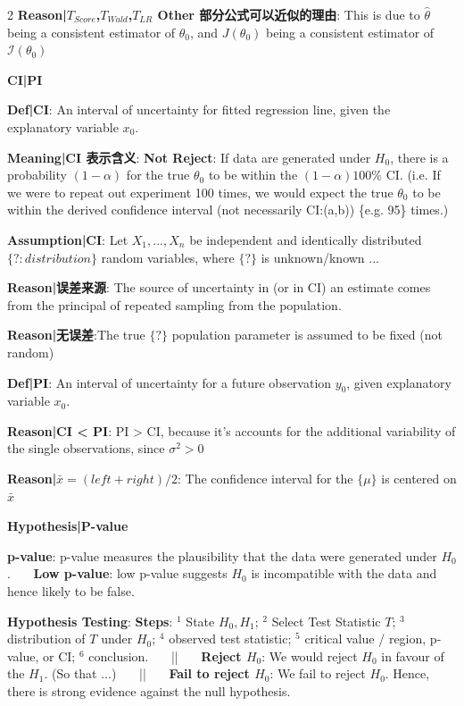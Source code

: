 \documentclass[9pt]{article}
\begin{document}
\begin{multicols}{2}
\textbf{Reason|$T_{Score}$,$T_{Wald}$,$T_{LR}$ Other 部分公式可以近似的理由}: This is due to $\widehat{\theta}$ being a consistent estimator of $\theta_0$, and $J(\theta_0)$ being a consistent estimator of $\mathcal{I}(\theta_0)$


\vspace{5pt}
\textbf{CI|PI}

\textbf{Def|CI}: An interval of uncertainty for fitted regression line, given the explanatory variable $x_0$.

\textbf{Meaning|CI 表示含义}: \textbf{Not Reject}: If data are generated under $H_0$, there is a probability $(1-\alpha)$ for the true $\theta_0$ to be within the $(1-\alpha)100\%$ CI. (i.e. If we were to repeat out experiment 100 times, we would expect the true $\theta_0$ to be within the derived confidence interval (not necessarily CI:(a,b)) \{e.g. 95\} times.)

\textbf{Assumption|CI}: Let $X_1,...,X_n$ be independent and identically distributed $\{?:distribution\}$ random variables, where $\{?\}$ is unknown/known ...

\textbf{Reason|误差来源}: The source of uncertainty in (or in CI) an estimate comes from the principal of repeated sampling from the population. 

\textbf{Reason|无误差}:The true $\{?\}$ population parameter is assumed to be fixed (not random)

\textbf{Def|PI}: An interval of uncertainty for a future observation $y_0$, given explanatory variable $x_0$.

\textbf{Reason|CI < PI}: PI > CI, because it's accounts for the additional variability of the single observations, since $\sigma^2>0$

\textbf{Reason|$\bar{x}=(left+right)/2$}: The confidence interval for the $\{\mu\}$ is centered on $\bar{x}$


\vspace{5pt}
\textbf{Hypothesis|P-value}

\textbf{p-value}: p-value measures the plausibility that the data were generated under $H_0$. \ \ \ \textbf{Low p-value}: low p-value suggests $H_0$ is incompatible with the data and hence likely to be false.

\textbf{Hypothesis Testing}:
\textbf{Steps}: $^1$ State $H_0,H_1$; $^2$ Select Test Statistic $T$; $^3$ distribution of $T$ under $H_0$; $^4$ observed test statistic; $^5$ critical value / region, p-value, or CI; $^6$ conclusion. \ \ \ || \ \ \ 
\textbf{Reject $H_0$}: We would reject $H_0$ in favour of the $H_1$. (So that ...) \ \ \ || \ \ \ 
\textbf{Fail to reject $H_0$}: We fail to reject $H_0$. Hence, there is strong evidence against the null hypothesis.



\end{multicols}
\end{document}

